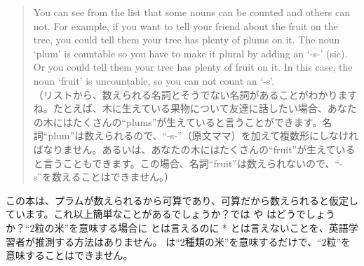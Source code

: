 \begin{quote}
    You can see from the list that some nouns can be counted and others can not. For example, if you want to tell your friend about the fruit on the tree, you could tell them your tree has plenty of plums on it. The noun `plum' is countable so you have to make it plural by adding an `-s-' (sic). Or you could tell them your tree has plenty of fruit on it. In this case, the noun `fruit' is uncountable, so you can not count an `-s'. \citet[1]{allen2008}\\
    （リストから、数えられる名詞とそうでない名詞があることがわかりますね。たとえば、木に生えている果物について友達に話したい場合、あなたの木にはたくさんの\enquote{plums}が生えていると言うことができます。名詞\enquote{plum}は数えられるので、\enquote{-s-}（原文ママ）を加えて複数形にしなければなりません。あるいは、あなたの木にはたくさんの\enquote{fruit}が生えていると言うこともできます。この場合、名詞\enquote{fruit}は数えられないので、\enquote{-s}を数えることはできません。）
\end{quote}

この本は、プラムが数えられるから可算であり、可算だから数えられると仮定しています。これ以上簡単なことがあるでしょうか？では  や  はどうでしょうか？\enquote{2粒の米}を意味する場合に  とは言えるのに * とは言えないことを、英語学習者が推測する方法はありません。 は\enquote{2種類の米}を意味するだけで、\enquote{2粒}を意味することはできません。

